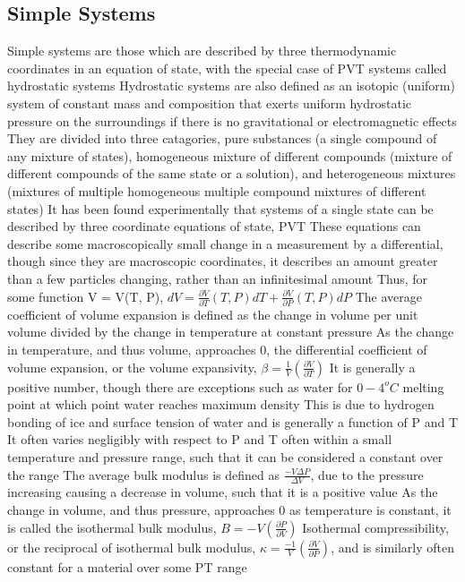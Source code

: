\documentclass[11 pt, twoside]{article}
\newenvironment{outline*}
{
	\begin{outline}[enumerate]
	}
	{\end{outline}
}
\begin{document}
\subsection{Simple Systems}
\begin{outline*}
\1 Simple systems are those which are described by three thermodynamic coordinates in an equation of state, with the special case of PVT systems called hydrostatic systems
\1 Hydrostatic systems are also defined as an isotopic (uniform) system of constant mass and composition that exerts uniform hydrostatic pressure on the surroundings if there is no gravitational or electromagnetic effects
\2 They are divided into three catagories, pure substances (a single compound of any mixture of states), homogeneous mixture of different compounds (mixture of different compounds of the same state or a solution), and heterogeneous mixtures (mixtures of multiple homogeneous multiple compound mixtures of different states)
\3 It has been found experimentally that systems of a single state can be described by three coordinate equations of state, PVT
\2 These equations can describe some macroscopically small change in a measurement by a differential, though since they are macroscopic coordinates, it describes an amount greater than a few particles changing, rather than an infinitesimal amount
\2 Thus, for some function V = V(T, P), $dV = \frac{\partial V}{\partial T}(T, P)dT + \frac{\partial V}{\partial P}(T, P)dP$
\3 The average coefficient of volume expansion is defined as the change in volume per unit volume divided by the change in temperature at constant pressure
\4 As the change in temperature, and thus volume, approaches 0, the differential coefficient of volume expansion, or the volume expansivity, $\beta = \frac{1}{V}(\frac{\partial V}{\partial T})$
\4 It is generally a positive number, though there are exceptions such as water for $0-4^o C$ melting point at which point water reaches maximum density
\4 This is due to hydrogen bonding of ice and surface tension of water and is generally a function of P and T
\4 It often varies negligibly with respect to P and T often within a small temperature and pressure range, such that it can be considered a constant over the range
\3 The average bulk modulus is defined as $\frac{-V\Delta P}{\Delta V}$, due to the pressure increasing causing a decrease in volume, such that it is a positive value
\4 As the change in volume, and thus pressure, approaches 0 as temperature is constant, it is called the isothermal bulk modulus, $B = -V(\frac{\partial P}{\partial V})$
\4 Isothermal compressibility, or the reciprocal of isothermal bulk modulus, $\kappa = \frac{-1}{V}(\frac{\partial V}{\partial P})$, and is similarly often constant for a material over some PT range

\end{outline*}
\end{document}

